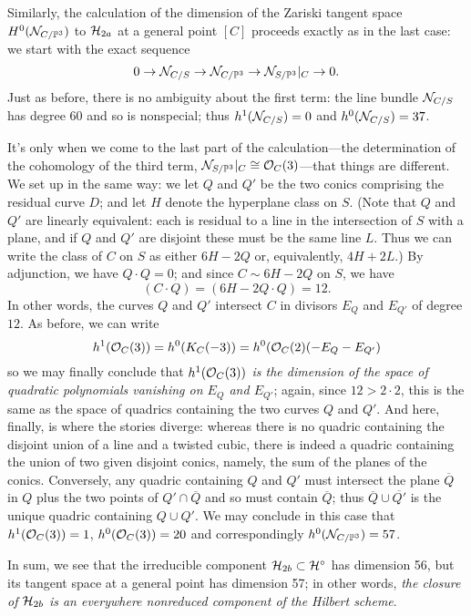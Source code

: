 Similarly, the calculation of the dimension of the Zariski tangent space $H^0(\cN_{C/\PP^3})$ to $\cH_{2a}$ at a general point $[C]$ proceeds exactly as in the last case: we start with the exact sequence
$$
0 \to \cN_{C/S} \to \cN_{C/\PP^3} \to \cN_{S/\PP^3}|_C \to 0.
$$ 
Just as before, there is no ambiguity about the first term: the line bundle $\cN_{C/S}$ has degree 60 and so is nonspecial; thus $h^1(\cN_{C/S}) = 0$ and $h^0(\cN_{C/S}) = 37$.

It's only when we come to the last part of the calculation---the determination of the cohomology of the third term, $\cN_{S/\PP^3}|_C \cong \cO_C(3)$---that things are different. We set up in the same way: we let $Q$ and $Q'$ be the  two conics comprising the residual curve $D$; and let $H$ denote the hyperplane class on $S$. (Note that $Q$ and $Q'$ are linearly equivalent: each is residual to a line in the intersection of $S$ with a plane, and if $Q$ and $Q'$ are disjoint these  must be the same line $L$. Thus we can write the class of $C$ on $S$ as either $6H-2Q$ or, equivalently, $4H+2L$.)
By adjunction, we have $Q \cdot Q = 0$; and since $C \sim 6H - 2Q$ on $S$, we have
$$
(C\cdot Q) = (6H - 2Q \cdot Q) = 12.
$$
In other words, the curves $Q$ and $Q'$ intersect $C$ in divisors $E_Q$ and $E_{Q'}$ of degree $12$. As before, we can write
$$
h^1(\cO_C(3)) = h^0(K_C(-3)) = h^0(\cO_C(2)(-E_Q-E_{Q'})
$$
so we may finally conclude that \emph{$h^1(\cO_C(3))$ is the dimension of the space of quadratic polynomials vanishing on $E_Q$ and $E_{Q'}$}; again, since $12 > 2\cdot 2$, this is the same as the space of quadrics containing the two curves $Q$ and $Q'$. And here, finally, is where the stories diverge: whereas there is no quadric containing the disjoint union of a line and a twisted cubic, there is indeed a quadric containing the union of two given disjoint conics, namely, the sum of the planes of the conics. Conversely, any quadric containing $Q$ and $Q'$ must intersect the plane $\overline Q$ in $Q$ plus the two points of $Q' \cap \overline Q$ and so must contain $\overline Q$; thus $\overline Q \cup \overline {Q'}$ is the unique quadric containing $Q \cup Q'$.  
 We may conclude in this case that $h^1(\cO_C(3))=1$,  $h^0(\cO_C(3)) = 20$ and correspondingly $h^0(\cN_{C/\PP^3}) = 57$.
 
 In sum, we see that the irreducible component $\cH_{2b} \subset \cH^\circ$ has dimension 56, but its tangent space at a general point has dimension 57; in other words, \emph{the closure of $\cH_{2b}$ is an everywhere nonreduced component of the Hilbert scheme}.

